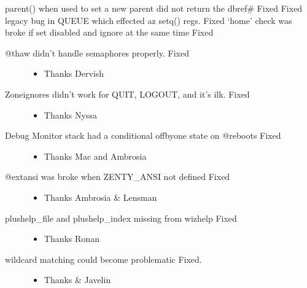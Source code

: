 \documentclass[letterpaper,10pt,english]{sphinxmanual}
\begin{document}
\sphinxAtStartPar
parent() when used to set a new parent did not return the dbref\# \sphinxhyphen{} Fixed
Fixed legacy bug in QUEUE which effected a\sphinxhyphen{}z setq() regs. \sphinxhyphen{} Fixed
‘home’ check was broke if set disabled and ignore at the same time \sphinxhyphen{} Fixed
\begin{description}
\item[{@thaw didn’t handle semaphores properly. \sphinxhyphen{} Fixed}] \leavevmode\begin{itemize}
\item {} 
\sphinxAtStartPar
Thanks Dervish

\end{itemize}

\item[{Zone\sphinxhyphen{}ignores didn’t work for QUIT, LOGOUT, and it’s ilk. \sphinxhyphen{} Fixed}] \leavevmode\begin{itemize}
\item {} 
\sphinxAtStartPar
Thanks Nyssa

\end{itemize}

\item[{Debug Monitor stack had a conditional off\sphinxhyphen{}by\sphinxhyphen{}one state on @reboots \sphinxhyphen{} Fixed}] \leavevmode\begin{itemize}
\item {} 
\sphinxAtStartPar
Thanks Mac and Ambrosia

\end{itemize}

\item[{@extansi was broke when ZENTY\_ANSI not defined \sphinxhyphen{} Fixed}] \leavevmode\begin{itemize}
\item {} 
\sphinxAtStartPar
Thanks Ambrosia \& Lensman

\end{itemize}

\item[{plushelp\_file and plushelp\_index missing from wizhelp \sphinxhyphen{} Fixed}] \leavevmode\begin{itemize}
\item {} 
\sphinxAtStartPar
Thanks Ronan

\end{itemize}

\item[{wildcard matching could become problematic \sphinxhyphen{} Fixed.}] \leavevmode\begin{itemize}
\item {} 
\sphinxAtStartPar
Thanks  \& Javelin

\end{itemize}

\end{description}
\end{document}
